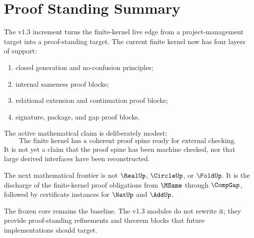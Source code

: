 
\chapter{Proof Standing Summary}

The v1.3 increment turns the finite-kernel live edge from a project-management target into a proof-standing target. The current finite kernel now has four layers of support:
\begin{enumerate}
\item closed generation and no-confusion principles;
\item internal sameness proof blocks;
\item relational extension and continuation proof blocks;
\item signature, package, and gap proof blocks.
\end{enumerate}

The active mathematical claim is deliberately modest:
\[
\boxed{\text{The finite kernel has a coherent proof spine ready for external checking.}}
\]
It is not yet a claim that the proof spine has been machine checked, nor that large derived interfaces have been reconstructed.

\begin{corollary}
The next mathematical frontier is not \(\RealUp\), \(\CircleUp\), or \(\FoldUp\). It is the discharge of the finite-kernel proof obligations from \(\MSame\) through \(\CompGap\), followed by certificate instances for \(\NatUp\) and \(\AddUp\).
\end{corollary}

\begin{remark}
The frozen core remains the baseline. The v1.3 modules do not rewrite it; they provide proof-standing refinements and theorem blocks that future implementations should target.
\end{remark}
